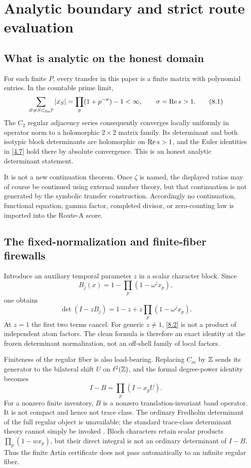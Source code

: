 \section{Analytic boundary and strict route evaluation}
\label{sec:route}

\subsection{What is analytic on the honest domain}

For each finite \(P\), every transfer in this paper is a finite matrix with
polynomial entries.  In the countable prime limit,
\[
\sum_{\varnothing\ne S\subset_{\mathrm{fin}}\mathbb P}
|x_S|
=\prod_p(1+p^{-\sigma})-1<\infty,
\qquad \sigma=\operatorname{Re} s>1.
\tag{8.1}\label{8.1}
\]
The \(C_2\) regular adjacency series consequently converges locally uniformly
in operator norm to a holomorphic \(2\times2\) matrix family.  Its determinant
and both isotypic block determinants are holomorphic on \(\operatorname{Re} s>1\), and the
Euler identities in \eqref{4.7} hold there by absolute convergence.  This is
an honest analytic determinant statement.

It is not a new continuation theorem.  Once \(\zeta\) is named, the displayed
ratios may of course be continued using external number theory, but that
continuation is not generated by the symbolic transfer construction.
Accordingly no continuation, functional equation, gamma factor, completed
divisor, or zero-counting law is imported into the Route-A score.

\subsection{The fixed-normalization and finite-fiber firewalls}

Introduce an auxiliary temporal parameter \(z\) in a scalar character block.
Since
\[
B_j(x)=1-\prod_p(1-\omega^jx_p),
\]
one obtains
\[
\det(I-zB_j)
=1-z+z\prod_p(1-\omega^jx_p).
\tag{8.2}\label{8.2}
\]
At \(z=1\) the first two terms cancel.  For generic \(z\ne1\),
\eqref{8.2} is not a product of independent atom factors.  The clean formula
is therefore an exact identity at the frozen determinant normalization, not
an off-shell family of local factors.

Finiteness of the regular fiber is also load-bearing.  Replacing \(C_m\) by
\(\mathbb Z\) sends its generator to the bilateral shift \(U\) on
\(\ell^2(\mathbb Z)\), and the formal degree-power identity becomes
\[
I-B=\prod_p(I-x_pU).
\tag{8.3}\label{8.3}
\]
For a nonzero finite inventory, \(B\) is a nonzero translation-invariant
band operator.  It is not compact and hence not trace class.  The ordinary
Fredholm determinant of the full regular object is unavailable; the standard
trace-class determinant theory cannot simply be invoked
\citep{Simon1977}.  Bloch characters retain scalar products
\(\prod_p(1-wx_p)\), but their direct integral is not an ordinary determinant
of \(I-B\).  Thus the finite Artin certificate does not pass automatically to
an infinite regular fiber.

